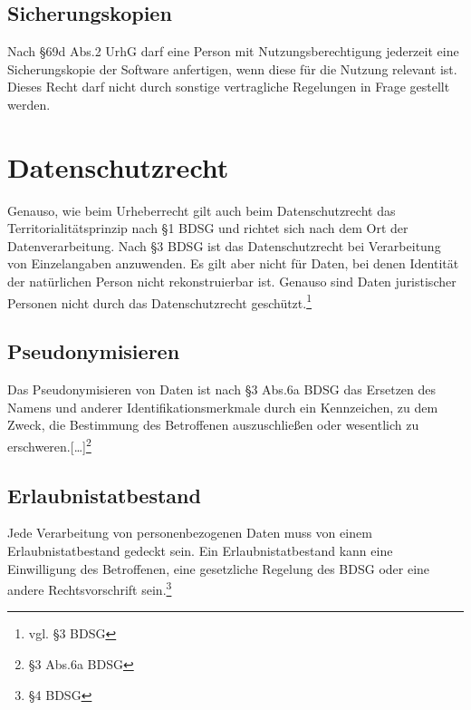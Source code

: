\subsection{Sicherungskopien}
Nach §69d Abs.2 UrhG darf eine Person mit Nutzungsberechtigung jederzeit eine Sicherungskopie der Software anfertigen, wenn diese f\"ur die Nutzung relevant ist. Dieses Recht darf nicht durch sonstige vertragliche Regelungen in Frage gestellt werden.
 \label{sicherungskopien}
\section{Datenschutzrecht}
Genauso, wie beim Urheberrecht gilt auch beim Datenschutzrecht das Territorialit\"atsprinzip nach §1 BDSG und richtet sich nach dem Ort der Datenverarbeitung. Nach §3 BDSG ist das Datenschutzrecht bei Verarbeitung von Einzelangaben anzuwenden. Es gilt aber nicht f\"ur Daten, bei denen Identit\"at der nat\"urlichen Person nicht rekonstruierbar ist. Genauso sind Daten juristischer Personen nicht durch das Datenschutzrecht gesch\"utzt.\footnote{vgl. §3 BDSG} 

\subsection{Pseudonymisieren}
Das Pseudonymisieren von Daten ist nach §3 Abs.6a BDSG {\glqq}das Ersetzen des Namens und anderer Identifikationsmerkmale durch ein Kennzeichen, zu dem Zweck, die Bestimmung des Betroffenen auszuschlie{\ss}en oder wesentlich zu erschweren.[…]{\grqq}\footnote{§3 Abs.6a BDSG} 
 \label{pseudonymisieren}
\subsection{Erlaubnistatbestand}
Jede Verarbeitung von personenbezogenen Daten muss von einem Erlaubnistatbestand gedeckt sein. Ein Erlaubnistatbestand kann eine Einwilligung des Betroffenen, eine gesetzliche Regelung des BDSG oder eine andere Rechtsvorschrift sein.\footnote{§4 BDSG}
 \label{erlaubnistatbestand}
